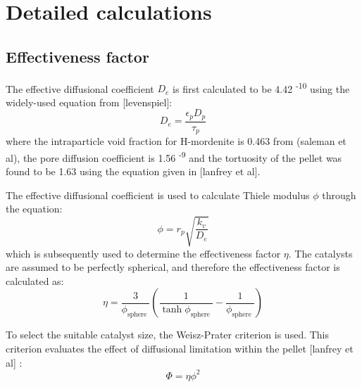 \section{Detailed calculations}
\label{app:reaction}

\subsection{Effectiveness factor}

The effective diffusional coefficient $D_e$ is first calculated to be 4.42 \textsuperscript{-10} using the widely-used equation from [levenspiel]: 
\begin{equation}
    D_e = \frac{\epsilon_p D_p}{\tau_p}
\end{equation}
where the intraparticle void fraction for H-mordenite is 0.463 from (saleman et al), the pore diffusion coefficient is 1.56 \textsuperscript{-9} and the tortuosity of the pellet was found to be 1.63 using the equation given in [lanfrey et al]. 

The effective diffusional coefficient is used to calculate Thiele modulus $\phi$ through the equation:
\begin{equation}
    \phi = r_p \sqrt{\frac{k_v}{D_e}}
\end{equation}
which is subsequently used to determine the effectiveness factor $\eta$. The catalysts are assumed to be perfectly spherical, and therefore the effectiveness factor is calculated as: 
\begin{equation}
\eta=\frac{3}{\phi_{\text {sphere }}}\left(\frac{1}{\tanh \phi_{\text {sphere }}}-\frac{1}{\phi_{\text {sphere }}}\right)
\end{equation}

To select the suitable catalyst size, the Weisz-Prater criterion is used. This criterion evaluates the effect of diffusional limitation within the pellet [lanfrey et al] :
\begin{equation}
    \Phi = \eta \phi^2
\end{equation}

